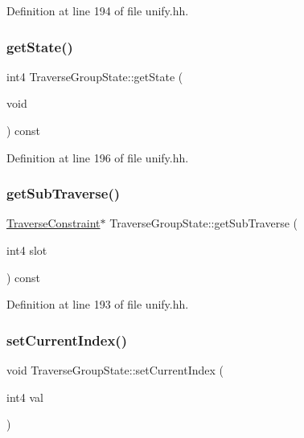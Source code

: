 Definition at line 194 of file unify.\+hh.

\mbox{\label{class_traverse_group_state_a78f0b4d20a459ba025d77ba93fbe1d55}} 
\subsubsection{\texorpdfstring{getState()}{getState()}}
{\footnotesize\ttfamily int4 Traverse\+Group\+State\+::get\+State (\begin{DoxyParamCaption}\item[{void}]{ }\end{DoxyParamCaption}) const\hspace{0.3cm}{\ttfamily [inline]}}



Definition at line 196 of file unify.\+hh.

\mbox{\label{class_traverse_group_state_a34635e24c1d4257230d35a91c4a2f8c9}} 
\subsubsection{\texorpdfstring{getSubTraverse()}{getSubTraverse()}}
{\footnotesize\ttfamily \mbox{\hyperlink{class_traverse_constraint}{Traverse\+Constraint}}$\ast$ Traverse\+Group\+State\+::get\+Sub\+Traverse (\begin{DoxyParamCaption}\item[{int4}]{slot }\end{DoxyParamCaption}) const\hspace{0.3cm}{\ttfamily [inline]}}



Definition at line 193 of file unify.\+hh.

\mbox{\label{class_traverse_group_state_a33d84f4d418ea6e16a41a8263a8565ac}} 
\subsubsection{\texorpdfstring{setCurrentIndex()}{setCurrentIndex()}}
{\footnotesize\ttfamily void Traverse\+Group\+State\+::set\+Current\+Index (\begin{DoxyParamCaption}\item[{int4}]{val }\end{DoxyParamCaption})\hspace{0.3cm}{\ttfamily [inline]}}



